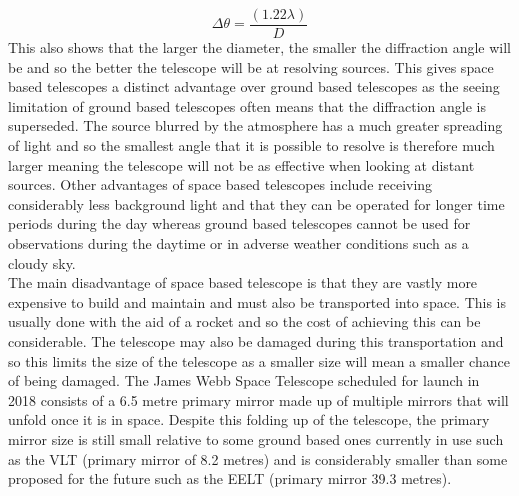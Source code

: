 \documentclass[pdf,color]{UoBnote}
\begin{document}
\begin{equation}
\Delta\theta= \frac{(1.22 \lambda)}D
\end{equation}
\newline
This also shows that the larger the diameter, the smaller the diffraction angle will be and so the better the telescope will be at resolving sources. This gives space based telescopes a distinct advantage over ground based telescopes as the seeing limitation of ground based telescopes often means that the diffraction angle is superseded. The source blurred by the atmosphere has a much greater spreading of light and so the smallest angle that it is possible to resolve is therefore much larger meaning the telescope will not be as effective when looking at distant sources. Other advantages of space based telescopes include receiving considerably less background light and that they can be operated for longer time periods during the day whereas ground based telescopes cannot be used for observations during the daytime or in adverse weather conditions such as a cloudy sky.\\
\newline
The main disadvantage of space based telescope is that they are vastly more expensive to build and maintain and must also be transported into space. This is usually done with the aid of a rocket and so the cost of achieving this can be considerable. The telescope may also be damaged during this transportation and so this limits the size of the telescope as a smaller size will mean a smaller chance of being damaged. The James Webb Space Telescope scheduled for launch in 2018 consists of a 6.5 metre primary mirror made up of multiple mirrors that will unfold once it is in space. Despite this folding up of the telescope, the primary mirror size is still small relative to some ground based ones currently in use such as the VLT (primary mirror of 8.2 metres) and is considerably smaller than some proposed for the future such as the EELT (primary mirror 39.3 metres). \\
\end{document}
